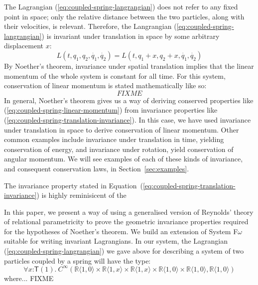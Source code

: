 \documentclass[preprint]{sigplanconf}
\theoremstyle{examplestyle}
\begin{document}
The Lagrangian (\ref{eq:coupled-spring-langrangian}) does not refer to
any fixed point in space; only the relative distance between the two
particles, along with their velocities, is relevant. Therefore, the
Langrangian (\ref{eq:coupled-spring-langrangian}) is invariant under
translation in space by some arbitrary displacement $x$:
\begin{equation}\label{eq:coupled-spring-translation-invariance}
  L(t,q_1,q_2,\dot{q_1},\dot{q_2}) = L(t,q_1+x,q_2+x,\dot{q_1},\dot{q_2})
\end{equation}
By Noether's theorem, invariance under spatial translation implies
that the linear momentum of the whole system is constant for all
time. For this system, conservation of linear momentum is stated
mathematically like so:
\begin{equation}\label{eq:coupled-spring-linear-momentum}
  FIXME
\end{equation}
In general, Noether's theorem gives us a way of deriving conserved
properties like (\ref{eq:coupled-spring-linear-momentum}) from
invariance properties like
(\ref{eq:coupled-spring-translation-invariance}). In this case, we
have used invariance under translation in space to derive conservation
of linear momentum. Other common examples include invariance under
translation in time, yielding conservation of energy, and invariance
under rotation, yield conservation of angular momentum. We will see
examples of each of these kinds of invariance, and consequent
conservation laws, in Section~\ref{sec:examples}.

The invariance property stated in
Equation~(\ref{eq:coupled-spring-translation-invariance}) is highly
reminisicent of the

In this paper, we present a way of using a generalised version of
Reynolds' theory of relational parametricity to prove the geometric
invariance properties required for the hypotheses of Noether's
theorem. We build an extension of System F$\omega$ suitable for
writing invariant Lagrangians. In our system, the Lagrangian
(\ref{eq:coupled-spring-langrangian}) we gave above for describing a
system of two particles coupled by a spring will have the type:
\begin{displaymath}
  \forall x \mathord: \mathsf{T}(1).~C^\infty(\mathbb{R}\langle 1, 0 \rangle \times \mathbb{R}\langle 1, x \rangle \times \mathbb{R}\langle 1, x \rangle \times \mathbb{R}\langle 1, 0 \rangle \times \mathbb{R}\langle 1, 0 \rangle, \mathbb{R}\langle 1, 0 \rangle)
\end{displaymath}
where... FIXME
\end{document}
